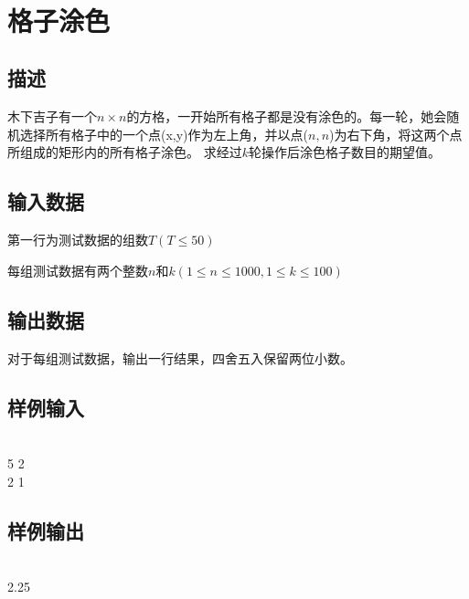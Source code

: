 \documentclass[UTF8]{ctexart}
\begin{document}
\tt
{}
\fi


\section{格子涂色}
\subsection*{描述}
木下吉子有一个$n\times n$的方格，一开始所有格子都是没有涂色的。每一轮，她会随机选择所有格子中的一个点(x,y)作为左上角，并以点($n,n$)为右下角，将这两个点所组成的矩形内的所有格子涂色。
求经过$k$轮操作后涂色格子数目的期望值。


\subsection*{输入数据}
第一行为测试数据的组数$T(T\leqslant 50)$

每组测试数据有两个整数$n$和$k(1\leqslant n\leqslant 1000,1\leqslant k\leqslant 100)$

\subsection*{输出数据}
对于每组测试数据，输出一行结果，四舍五入保留两位小数。

\subsection*{样例输入}
\\
5 2\\
2 1

\subsection*{样例输出}
\\
2.25


\ifx\allfiles\undefined
\end{document}
